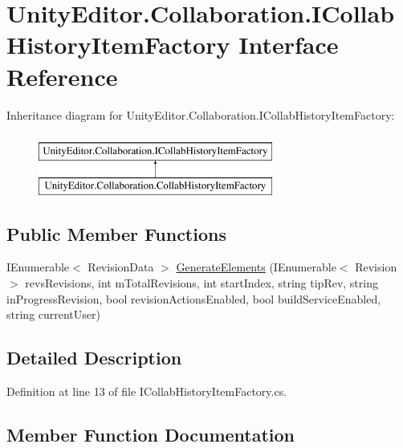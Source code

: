\hypertarget{interface_unity_editor_1_1_collaboration_1_1_i_collab_history_item_factory}{}\section{Unity\+Editor.\+Collaboration.\+I\+Collab\+History\+Item\+Factory Interface Reference}
\label{interface_unity_editor_1_1_collaboration_1_1_i_collab_history_item_factory}
Inheritance diagram for Unity\+Editor.\+Collaboration.\+I\+Collab\+History\+Item\+Factory\+:\begin{figure}[H]
\begin{center}
\leavevmode
\includegraphics[height=2.000000cm]{interface_unity_editor_1_1_collaboration_1_1_i_collab_history_item_factory}
\end{center}
\end{figure}
\subsection*{Public Member Functions}
\begin{DoxyCompactItemize}
\item 
I\+Enumerable$<$ Revision\+Data $>$ \mbox{\hyperlink{interface_unity_editor_1_1_collaboration_1_1_i_collab_history_item_factory_a82679f4deecbbb2a95fc125228a6a22e}{Generate\+Elements}} (I\+Enumerable$<$ Revision $>$ revs\+Revisions, int m\+Total\+Revisions, int start\+Index, string tip\+Rev, string in\+Progress\+Revision, bool revision\+Actions\+Enabled, bool build\+Service\+Enabled, string current\+User)
\end{DoxyCompactItemize}


\subsection{Detailed Description}


Definition at line 13 of file I\+Collab\+History\+Item\+Factory.\+cs.



\subsection{Member Function Documentation}
\mbox{\label{interface_unity_editor_1_1_collaboration_1_1_i_collab_history_item_factory_a82679f4deecbbb2a95fc125228a6a22e}} 

